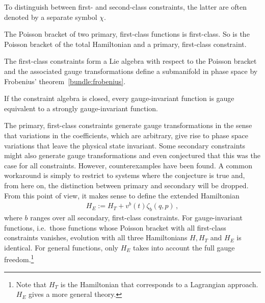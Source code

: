     \begin{notation}
        To distinguish between first- and second-class constraints, the latter are often denoted by a separate symbol $\chi$.
    \end{notation}
    \begin{property}[Closure]
        The Poisson bracket of two primary, first-class functions is first-class. So is the Poisson bracket of the total Hamiltonian and a primary, first-class constraint.
    \end{property}
    \begin{result}
        The first-class constraints form a Lie algebra with respect to the Poisson bracket and the associated gauge transformations define a submanifold in phase space by Frobenius' theorem~\ref{bundle:frobenius}.
    \end{result}

    \begin{property}
        If the constraint algebra is closed, every gauge-invariant function is gauge equivalent to a strongly gauge-invariant function.
    \end{property}

    \begin{remark}
        The primary, first-class constraints generate gauge transformations in the sense that variations in the coefficients, which are arbitrary, give rise to phase space variations that leave the physical state invariant. Some secondary constraints might also generate gauge transformations and  even conjectured that this was the case for all constraints. However, counterexamples have been found. A common workaround is simply to restrict to systems where the conjecture is true and, from here on, the distinction between primary and secondary will be dropped.\mnote{\dbend} From this point of view, it makes sense to define the extended Hamiltonian
        \begin{gather}
            \label{constraint:extended_hamiltonian}
            H_E := H_T + v^b(t)\zeta_b(q,p)\,,
        \end{gather}
        where $b$ ranges over all secondary, first-class constraints. For gauge-invariant functions, i.e.~those functions whose Poisson bracket with all first-class constraints vanishes, evolution with all three Hamiltonians $H,H_T$ and $H_E$ is identical. For general functions, only $H_E$ takes into account the full gauge freedom.\footnote{Note that $H_T$ is the Hamiltonian that corresponds to a Lagrangian approach. $H_E$ gives a more general theory.}
    \end{remark}

